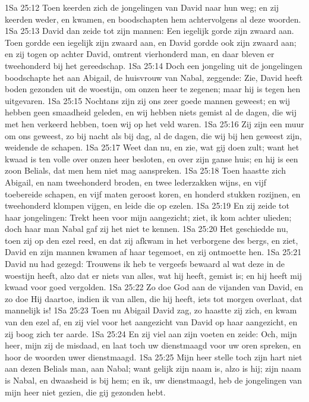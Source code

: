 1Sa 25:12  Toen keerden zich de jongelingen van David naar hun weg; en zij keerden weder, en kwamen, en boodschapten hem achtervolgens al deze woorden.
1Sa 25:13  David dan zeide tot zijn mannen: Een iegelijk gorde zijn zwaard aan. Toen gordde een iegelijk zijn zwaard aan, en David gordde ook zijn zwaard aan; en zij togen op achter David, omtrent vierhonderd man, en daar bleven er tweehonderd bij het gereedschap.
1Sa 25:14  Doch een jongeling uit de jongelingen boodschapte het aan Abigail, de huisvrouw van Nabal, zeggende: Zie, David heeft boden gezonden uit de woestijn, om onzen heer te zegenen; maar hij is tegen hen uitgevaren.
1Sa 25:15  Nochtans zijn zij ons zeer goede mannen geweest; en wij hebben geen smaadheid geleden, en wij hebben niets gemist al de dagen, die wij met hen verkeerd hebben, toen wij op het veld waren.
1Sa 25:16  Zij zijn een muur om ons geweest, zo bij nacht als bij dag, al de dagen, die wij bij hen geweest zijn, weidende de schapen.
1Sa 25:17  Weet dan nu, en zie, wat gij doen zult; want het kwaad is ten volle over onzen heer besloten, en over zijn ganse huis; en hij is een zoon Belials, dat men hem niet mag aanspreken.
1Sa 25:18  Toen haastte zich Abigail, en nam tweehonderd broden, en twee lederzakken wijns, en vijf toebereide schapen, en vijf maten geroost koren, en honderd stukken rozijnen, en tweehonderd klompen vijgen, en leide die op ezelen.
1Sa 25:19  En zij zeide tot haar jongelingen: Trekt heen voor mijn aangezicht; ziet, ik kom achter ulieden; doch haar man Nabal gaf zij het niet te kennen.
1Sa 25:20  Het geschiedde nu, toen zij op den ezel reed, en dat zij afkwam in het verborgene des bergs, en ziet, David en zijn mannen kwamen af haar tegemoet, en zij ontmoette hen.
1Sa 25:21  David nu had gezegd: Trouwens ik heb te vergeefs bewaard al wat deze in de woestijn heeft, alzo dat er niets van alles, wat hij heeft, gemist is; en hij heeft mij kwaad voor goed vergolden.
1Sa 25:22  Zo doe God aan de vijanden van David, en zo doe Hij daartoe, indien ik van allen, die hij heeft, iets tot morgen overlaat, dat mannelijk is!
1Sa 25:23  Toen nu Abigail David zag, zo haastte zij zich, en kwam van den ezel af, en zij viel voor het aangezicht van David op haar aangezicht, en zij boog zich ter aarde.
1Sa 25:24  En zij viel aan zijn voeten en zeide: Och, mijn heer, mijn zij de misdaad, en laat toch uw dienstmaagd voor uw oren spreken, en hoor de woorden uwer dienstmaagd.
1Sa 25:25  Mijn heer stelle toch zijn hart niet aan dezen Belials man, aan Nabal; want gelijk zijn naam is, alzo is hij; zijn naam is Nabal, en dwaasheid is bij hem; en ik, uw dienstmaagd, heb de jongelingen van mijn heer niet gezien, die gij gezonden hebt.
